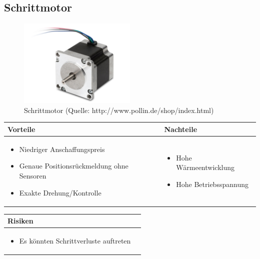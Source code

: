 \pagebreak


\subsection{Schrittmotor}

\begin{figure}[h!]%
\centering
\includegraphics[width=0.5\textwidth]{fig/schrittmotor.JPG}
\caption{Schrittmotor (Quelle: http://www.pollin.de/shop/index.html)}
\label{fig:Java}
\end{figure}

\begin{table}[h]
\begin{tabular}{p{} | p{}}


 \textbf{Vorteile} & \textbf{Nachteile} \\ \hline
	 
\begin{itemize}
\item Niedriger Anschaffungspreis
\item Genaue Positionsrückmeldung ohne Sensoren
\item Exakte Drehung/Kontrolle
\end{itemize}

 
 &
 
\begin{itemize}
\item Hohe Wärmeentwicklung
\item Hohe Betriebsspannung
\end{itemize}

\end{tabular}
\end{table}

\begin{table}[h]
\begin{tabular}{p{}p{}}


 \textbf{Risiken} & \\ \hline
	 
\begin{itemize}
\item Es könnten Schrittverluste auftreten
\end{itemize}

 
\end{tabular}
\end{table}

